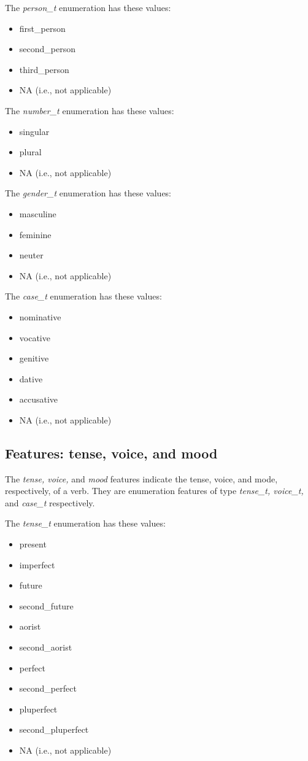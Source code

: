 \documentclass[11pt,oneside,a4paper]{memoir}
\begin{document}
The \emph{person\_t} enumeration has these values:

\begin{itemize}
\item first\_person
\item second\_person
\item third\_person
\item NA (i.e., not applicable)
\end{itemize}

The \emph{number\_t} enumeration has these values:

\begin{itemize}
\item singular
\item plural
\item NA (i.e., not applicable)
\end{itemize}

The \emph{gender\_t} enumeration has these values:

\begin{itemize}
\item masculine
\item feminine
\item neuter
\item NA (i.e., not applicable)
\end{itemize}

The \emph{case\_t} enumeration has these values:

\begin{itemize}
\item nominative
\item vocative
\item genitive
\item dative
\item accusative
\item NA (i.e., not applicable)
\end{itemize}

\subsection{Features: tense, voice, and mood}

The \emph{tense, voice,} and \emph{mood} features indicate the tense, voice, and
mode, respectively, of a verb. They are enumeration features of type \emph{tense\_t, voice\_t,}
and \emph{case\_t} respectively.

The \emph{tense\_t} enumeration has these values:

\begin{itemize}
\item present
\item imperfect
\item future
\item second\_future
\item aorist
\item second\_aorist
\item perfect
\item second\_perfect
\item pluperfect
\item second\_pluperfect
\item NA (i.e., not applicable)
\end{itemize}
\end{document}
